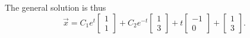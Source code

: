 \begin{enumerate}[label=\arabic*.]
\begin{equation*}
			\end{equation*}
			The general solution is thus
			\begin{equation*}
				\vec{x} = C_1e^{t}\begin{bmatrix}
					1 \\
					1
				\end{bmatrix} + C_2e^{-t}\begin{bmatrix}
					1 \\
					3
				\end{bmatrix} + t\begin{bmatrix}
					-1 \\
					0
				\end{bmatrix} + \begin{bmatrix}
					1 \\
					3
				\end{bmatrix}.
			\end{equation*}
\end{enumerate}